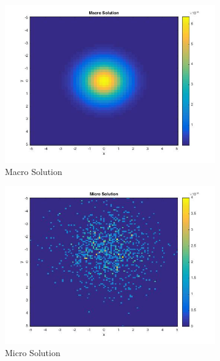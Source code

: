 \documentclass[10pt]{article}
\begin{document}
\begin{figure}
\begin{subfigure}{.5\linewidth}
\centering
\includegraphics[scale = .45]{MacroPlot.jpg}
\caption{Macro Solution}
\label{fig:macroPlot}
\end{subfigure}%
\begin{subfigure}{.5\linewidth}
\centering
\includegraphics[scale = .45]{MicroPlot.jpg}
\caption{Micro Solution}
\label{fig:microPlot}
\end{subfigure}\\[1ex]
\begin{subfigure}{\linewidth}
\centering

\end{subfigure}
\end{figure}
\end{document}
